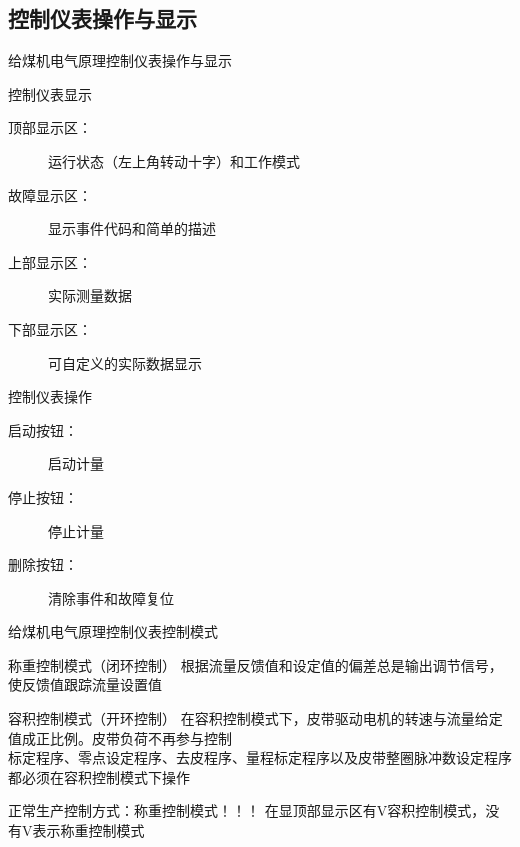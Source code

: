\documentclass[12pt,hyperref={CJKbookmarks=true}]{beamer} %
\begin{document}
\subsection{控制仪表操作与显示}
	
	\begin{frame}{给煤机电气原理}{控制仪表操作与显示}
		\begin{block}{控制仪表显示}
				\begin{description}
				\item[顶部显示区：]  运行状态（左上角转动十字）和工作模式
				\item[故障显示区：]  显示事件代码和简单的描述
				\item[上部显示区：]  实际测量数据
				\item[下部显示区：]  可自定义的实际数据显示
			\end{description}

		\end{block}
\begin{block}{控制仪表操作}
				\begin{description}
				\item[启动按钮：]  启动计量
				\item[停止按钮：]  停止计量
				\item[删除按钮：]  清除事件和故障复位
			\end{description}

		\end{block}
	\end{frame}
\begin{frame}{给煤机电气原理}{控制仪表控制模式}
		\begin{block}{称重控制模式（闭环控制）}
				根据流量反馈值和设定值的偏差总是输出调节信号，使反馈值跟踪流量设置值
			

		\end{block}
\begin{exampleblock}{容积控制模式（开环控制）}
			在容积控制模式下，皮带驱动电机的转速与流量给定值成正比例。皮带负荷不再参与控制\\
标定程序、零点设定程序、去皮程序、量程标定程序以及皮带整圈脉冲数设定程序都必须在容积控制模式下操作
		\end{exampleblock}
\begin{alertblock}{正常生产控制方式：称重控制模式！！！}
			在显顶部显示区有V容积控制模式，没有V表示称重控制模式
		\end{alertblock}
	\end{frame}
\end{document}

